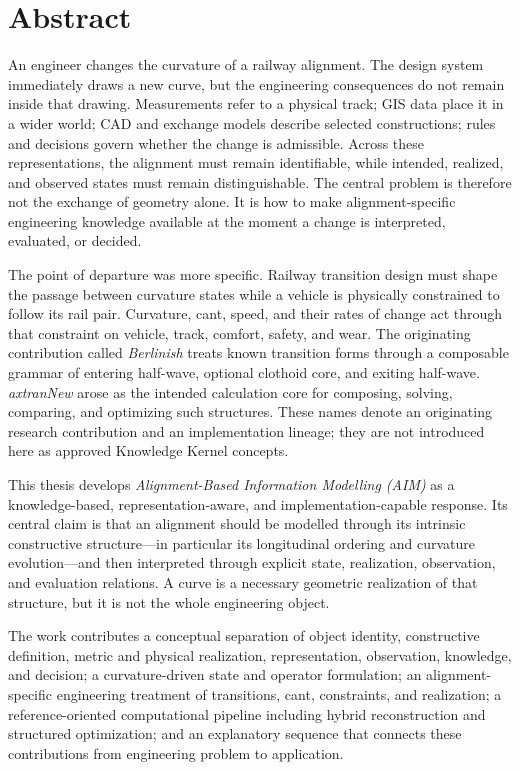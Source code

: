 
\cleardoublepage
\chapter*{Abstract}
{}

An engineer changes the curvature of a railway alignment. The design system
immediately draws a new curve, but the engineering consequences do not remain
inside that drawing. Measurements refer to a physical track; GIS data place it
in a wider world; CAD and exchange models describe selected constructions;
rules and decisions govern whether the change is admissible. Across these
representations, the alignment must remain identifiable, while intended,
realized, and observed states must remain distinguishable. The central problem
is therefore not the exchange of geometry alone. It is how to make
alignment-specific engineering knowledge available at the moment a change is
interpreted, evaluated, or decided.

The point of departure was more specific. Railway transition design must shape
the passage between curvature states while a vehicle is physically constrained
to follow its rail pair. Curvature, cant, speed, and their rates of change act
through that constraint on vehicle, track, comfort, safety, and wear. The
originating contribution called \emph{Berlinish} treats known transition forms
through a composable grammar of entering half-wave, optional clothoid core, and
exiting half-wave. \emph{axtranNew} arose as the intended calculation core for
composing, solving, comparing, and optimizing such structures. These names
denote an originating research contribution and an implementation lineage;
they are not introduced here as approved Knowledge Kernel concepts.

This thesis develops \emph{Alignment-Based Information Modelling (AIM)} as a
knowledge-based, representation-aware, and implementation-capable response.
Its central claim is that an alignment should be modelled through its intrinsic
constructive structure---in particular its longitudinal ordering and curvature
evolution---and then interpreted through explicit state, realization,
observation, and evaluation relations. A curve is a necessary geometric
realization of that structure, but it is not the whole engineering object.

The work contributes a conceptual separation of object identity, constructive
definition, metric and physical realization, representation, observation,
knowledge, and decision; a curvature-driven state and operator formulation; an
alignment-specific engineering treatment of transitions, cant, constraints,
and realization; a reference-oriented computational pipeline including hybrid
reconstruction and structured optimization; and an explanatory sequence that
connects these contributions from engineering problem to application.

